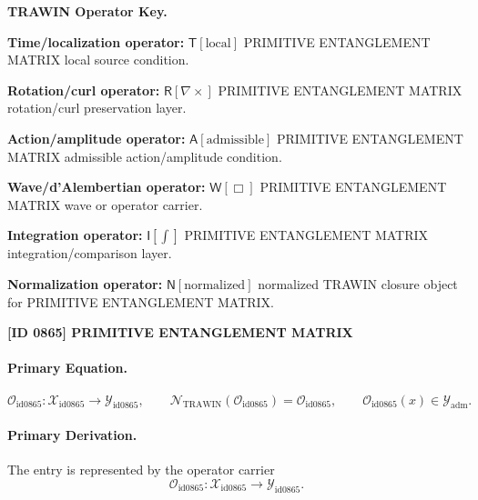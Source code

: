 \par\vspace{0.45\baselineskip}
\noindent\begin{minipage}[t]{\linewidth}
\begingroup
\small
\raggedright
\textbf{TRAWIN Operator Key.}\par
\noindent\textbf{Time/localization operator:} $\mathsf{T}\!\left[\mathrm{local}\right]$ PRIMITIVE ENTANGLEMENT MATRIX local source condition.\par
\noindent\textbf{Rotation/curl operator:} $\mathsf{R}\!\left[\nabla\times\right]$ PRIMITIVE ENTANGLEMENT MATRIX rotation/curl preservation layer.\par
\noindent\textbf{Action/amplitude operator:} $\mathsf{A}\!\left[\mathrm{admissible}\right]$ PRIMITIVE ENTANGLEMENT MATRIX admissible action/amplitude condition.\par
\noindent\textbf{Wave/d'Alembertian operator:} $\mathsf{W}\!\left[\Box\right]$ PRIMITIVE ENTANGLEMENT MATRIX wave or operator carrier.\par
\noindent\textbf{Integration operator:} $\mathsf{I}\!\left[\int\right]$ PRIMITIVE ENTANGLEMENT MATRIX integration/comparison layer.\par
\noindent\textbf{Normalization operator:} $\mathsf{N}\!\left[\mathrm{normalized}\right]$ normalized TRAWIN closure object for PRIMITIVE ENTANGLEMENT MATRIX.\par
\endgroup
\end{minipage}

\clearpage
\noindent\textbf{[ID 0865] PRIMITIVE ENTANGLEMENT MATRIX}\par
\vspace{0.35em}
\paragraph{Primary Equation.}
\[
\mathcal{O}_{\mathrm{id0865}}:\mathcal{X}_{\mathrm{id0865}}\longrightarrow \mathcal{Y}_{\mathrm{id0865}},\qquad
\mathcal{N}_{\mathrm{TRAWIN}}(\mathcal{O}_{\mathrm{id0865}})=\mathcal{O}_{\mathrm{id0865}},\qquad
\mathcal{O}_{\mathrm{id0865}}(x)\in\mathcal{Y}_{\mathrm{adm}}.
\]

\paragraph{Primary Derivation.} The entry is represented by the operator carrier\[
\mathcal{O}_{\mathrm{id0865}}:\mathcal{X}_{\mathrm{id0865}}\longrightarrow \mathcal{Y}_{\mathrm{id0865}}.
\]

